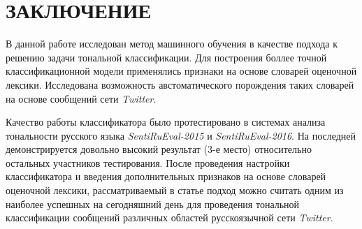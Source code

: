 \newpage
\part*{\large \centering ЗАКЛЮЧЕНИЕ}

В данной работе исследован метод машинного обучения в качестве подхода к решению
задачи тональной классификации.
Для построения боллее точной классификационной модели применялись признаки
на основе словарей оценочной лексики.
Исследована возможность австоматического порождения таких словарей на основе
сообщений сети {\it Twitter}.

Качество работы классификатора было протестировано в системах анализа тональности
русского языка {\it SentiRuEval-2015} и {\it SentiRuEval-2016}.
На последней демонстрируется довольно высокий результат (3-е место)
относительно остальных участников тестирования.
После проведения настройки классификатора и введения дополнительных признаков на
основе словарей оценочной лексики, рассматриваемый в статье подход можно считать
одним из наиболее успешных на сегодняшний день для проведения тональной
классификации сообщений различных областей русскоязычной сети {\it Twitter}.
